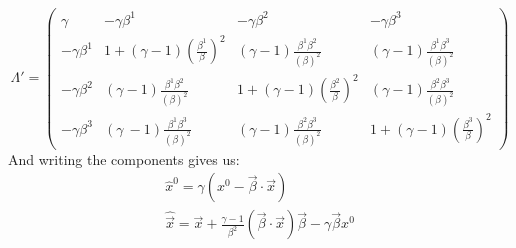 \documentclass{article}
\begin{document}
\begin{equation}
    \Lambda' = \begin{pmatrix}
            \gamma &
            -\gamma\beta^1 &
            -\gamma\beta^2 &
            -\gamma\beta^3
        \\
            -\gamma\beta^1 &
            1 + (\gamma - 1)\left(\frac{\beta^1}{\beta}\right)^2 &
            (\gamma - 1)\frac{\beta^1\beta^2}{(\beta)^2} &
            (\gamma - 1)\frac{\beta^1\beta^3}{(\beta)^2}
        \\
            -\gamma\beta^2 &
            (\gamma - 1)\frac{\beta^1\beta^2}{(\beta)^2} &
            1 + (\gamma - 1)\left(\frac{\beta^2}{\beta}\right)^2 &
            (\gamma - 1)\frac{\beta^2\beta^3}{(\beta)^2}
        \\
            -\gamma\beta^3 &
            (\gamma\ - 1)\frac{\beta^1\beta^3}{(\beta)^2} &
            (\gamma - 1) \frac{\beta^2\beta^3}{(\beta)^2} &
            1 + (\gamma - 1)\left(\frac{\beta^3}{\beta}\right)^2
    \end{pmatrix}
\end{equation}
And writing the components gives us:
\begin{equation}
\begin{gathered}
    \hat{x}^0 = \gamma(x^0 - \vec{\beta}\cdot\vec{x})
    \\
    \hat{\vec{x}} = \vec{x} + \frac{\gamma - 1}{\beta^2}\left(\vec{\beta}\cdot\vec{x}\right)\vec{\beta} - \gamma\vec{\beta}x^0
\end{gathered}
\end{equation}
\end{document}
